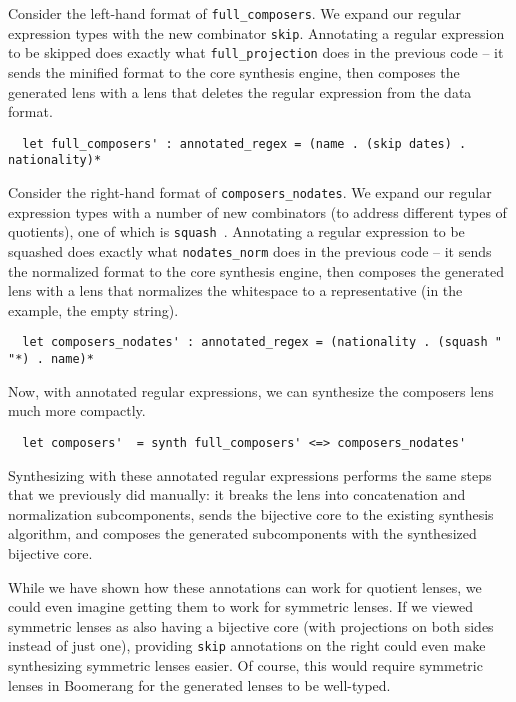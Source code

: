 \documentclass[a4paper]{article}
\begin{document}
Consider the left-hand format of \lstinline{full_composers}. We expand our
regular expression types with the new combinator \lstinline{skip}. Annotating a
regular expression to be skipped does exactly what \lstinline{full_projection}
does in the previous code -- it sends the minified format to the core synthesis
engine, then composes the generated lens with a lens that deletes the regular
expression from the data format.
%
\begin{lstlisting}
  let full_composers' : annotated_regex = (name . (skip dates) . nationality)*
\end{lstlisting}
%

Consider the right-hand format of \lstinline{composers_nodates}. We expand our
regular expression types with a number of new combinators (to address different
types of quotients), one of which is
\lstinline{squash}~\cite{maina+:quotient-synthesis}. Annotating a regular
expression to be squashed does exactly what \lstinline{nodates_norm} does in the
previous code -- it sends the normalized format to the core synthesis engine,
then composes the generated lens with a lens that normalizes the whitespace to a
representative (in the example, the empty string).
%
\begin{lstlisting}
  let composers_nodates' : annotated_regex = (nationality . (squash " "*) . name)*
\end{lstlisting}
%

Now, with annotated regular expressions, we can synthesize the composers lens much
more compactly.
%
\begin{lstlisting}
  let composers'  = synth full_composers' <=> composers_nodates'
\end{lstlisting}
%
Synthesizing with these annotated regular expressions performs the same steps
that we previously did manually: it breaks the lens into concatenation and
normalization subcomponents, sends the bijective core to the existing synthesis
algorithm, and composes the generated subcomponents with the synthesized
bijective core.

While we have shown how these annotations can work for quotient lenses, we could
even imagine getting them to work for symmetric lenses. If we viewed symmetric
lenses as also having a bijective core (with projections on both sides instead
of just one), providing \lstinline{skip} annotations on the right could even
make synthesizing symmetric lenses easier. Of course, this would require
symmetric lenses in Boomerang for the generated lenses to be well-typed.

 

\end{document}
